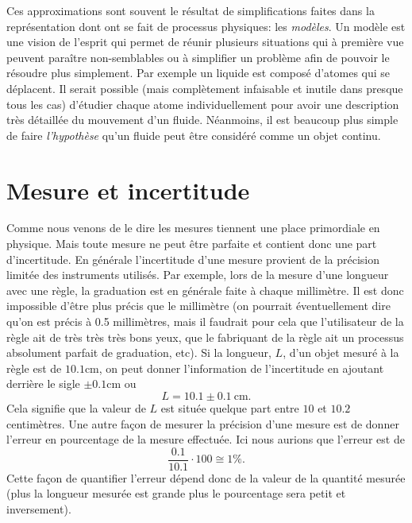 \documentclass[a4paper,12pt]{book}
\newcommand{\cm}{\mathrm{cm}}
\begin{document}
Ces approximations sont souvent le résultat de simplifications faites dans la représentation dont ont se fait 
de processus physiques: les \textit{modèles}. Un modèle est une vision de l'esprit qui permet de réunir plusieurs
situations qui à première vue peuvent paraître non-semblables ou à simplifier un problème afin de pouvoir le résoudre plus simplement. 
Par exemple un liquide est composé d'atomes qui se déplacent. Il serait possible (mais complètement infaisable et inutile dans presque tous les cas) 
d'étudier chaque atome individuellement pour avoir une description très détaillée du mouvement d'un fluide. Néanmoins, il est beaucoup plus simple de 
faire \textit{l'hypothèse} qu'un fluide peut être considéré comme un objet continu.

\section{Mesure et incertitude}

Comme nous venons de le dire les mesures tiennent une place primordiale en physique. Mais toute mesure ne peut être 
parfaite et contient donc une part d'incertitude. En générale l'incertitude d'une mesure provient 
de la précision limitée des instruments utilisés. Par exemple, lors de la mesure d'une longueur avec une règle,
la graduation est en générale faite à chaque millimètre. Il est donc impossible d'être plus précis
que le millimètre (on pourrait éventuellement dire qu'on est précis à 0.5 millimètres, mais il faudrait pour cela que l'utilisateur de la 
règle ait de très très très bons yeux, que le fabriquant de la règle ait un processus absolument parfait de graduation, etc).
Si la longueur, $L$, d'un objet mesuré à la règle est de $10.1\cm$, on peut donner l'information de l'incertitude 
en ajoutant derrière le sigle $\pm 0.1\cm$ ou
\begin{equation*}
 L=10.1\pm0.1\ \cm.
\end{equation*}
Cela signifie que la valeur de $L$ est située quelque part entre $10$ et $10.2$ centimètres.
Une autre façon de mesurer la précision d'une mesure est de donner l'erreur en pourcentage de la mesure effectuée.
Ici nous aurions que l'erreur est de
\begin{equation*}
 \frac{0.1}{10.1}\cdot 100\cong 1\%.
\end{equation*}
Cette façon de quantifier l'erreur dépend donc de la valeur de la quantité mesurée (plus la longueur mesurée est grande plus
le pourcentage sera petit et inversement).
\end{document}
